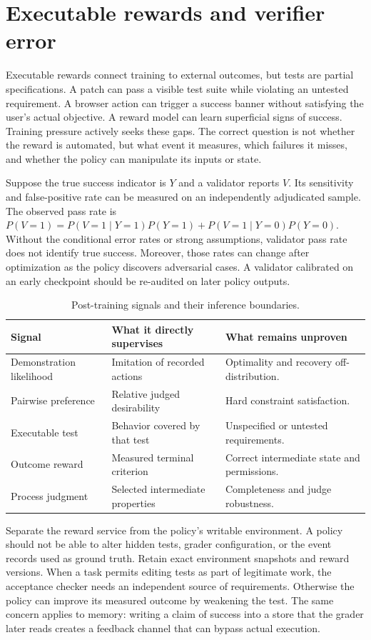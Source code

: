 \section{Executable rewards and verifier error}
\label{sec:C08:rewards}
Executable rewards connect training to external outcomes, but tests are partial specifications. A patch can pass a visible test suite while violating an untested requirement. A browser action can trigger a success banner without satisfying the user's actual objective. A reward model can learn superficial signs of success. Training pressure actively seeks these gaps. The correct question is not whether the reward is automated, but what event it measures, which failures it misses, and whether the policy can manipulate its inputs or state.

Suppose the true success indicator is $Y$ and a validator reports $V$. Its sensitivity and false-positive rate can be measured on an independently adjudicated sample. The observed pass rate is $P(V=1)=P(V=1\mid Y=1)P(Y=1)+P(V=1\mid Y=0)P(Y=0)$. Without the conditional error rates or strong assumptions, validator pass rate does not identify true success. Moreover, those rates can change after optimization as the policy discovers adversarial cases. A validator calibrated on an early checkpoint should be re-audited on later policy outputs.

{\small\setlength{\tabcolsep}{3pt}
\begin{table}[!htbp]
\centering
\caption{Post-training signals and their inference boundaries.}\label{tab:C08:signals}
\begin{tabular}{L{28mm}L{37mm}L{41mm}}

\toprule Signal & What it directly supervises & What remains unproven\\\midrule
Demonstration likelihood & Imitation of recorded actions & Optimality and recovery off-distribution.\\
Pairwise preference & Relative judged desirability & Hard constraint satisfaction.\\
Executable test & Behavior covered by that test & Unspecified or untested requirements.\\
Outcome reward & Measured terminal criterion & Correct intermediate state and permissions.\\
Process judgment & Selected intermediate properties & Completeness and judge robustness.\\
\bottomrule
\end{tabular}
\end{table}
}

Separate the reward service from the policy's writable environment. A policy should not be able to alter hidden tests, grader configuration, or the event records used as ground truth. Retain exact environment snapshots and reward versions. When a task permits editing tests as part of legitimate work, the acceptance checker needs an independent source of requirements. Otherwise the policy can improve its measured outcome by weakening the test. The same concern applies to memory: writing a claim of success into a store that the grader later reads creates a feedback channel that can bypass actual execution.

